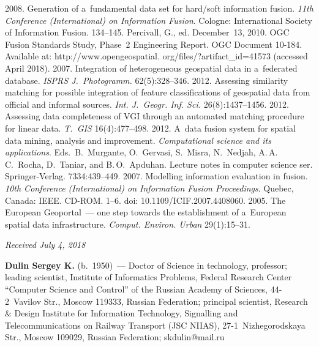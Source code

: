 \begin{multicols}{2}
{{\begin{thebibliography}{99}
 2008. Generation of a~fundamental data set for hard/soft information fusion.
\textit{11th Conference (International) on Information Fusion}. Cologne: International Society of 
Information Fusion. 134--145.
Percivall, G., ed. 
December~13, 2010. OGC Fusion Standards Study, Phase~2 Engineering Report. OGC Document  
10-184.  Available at: {\sf 
http://www.opengeospatial. org/files/?artifact\_id=41573} (accessed April 2018).
 2007. Integration of heterogeneous geospatial data in 
a~federated database. \textit{ISPRS J.~Photogramm.} 62(5):328--346. 
 2012. Assessing similarity matching for possible integration 
of feature classifications of geospatial data from official and informal sources. \textit{Int. 
J.~Geogr. Inf. Sci.} 26(8):1437--1456.
 2012. Assessing data completeness of VGI 
through an automated matching procedure for linear data. \textit{T.~GIS} 16(4):477--498.
 2012. A~data fusion system for spatial data mining, analysis 
and improvement. \textit{Computational science and its applications}. Eds.\ 
B.~Murgante, O.~Gervasi, S.~Misra, N.~Nedjah, A.\,A.\,C.~Rocha, D.~Taniar, and 
B.\,O.~Apduhan.  Lecture notes in computer science ser. Springer-Verlag. 7334:439--449. 
\bibitem{13-dul-1}
 2007. Modelling information evaluation in fusion. \textit{10th Conference 
(International) on Information Fusion Proceedings}. Quebec, Canada: IEEE. CD-ROM.  1--6.
doi: 
10.1109/ICIF.2007.4408060.
 2005. The European  
Geoportal~--- one step towards the establishment of a~European spatial data infrastructure. 
\textit{Comput. Environ. Urban} 29(1):15--31.
\end{thebibliography}

 }
 }

\end{multicols}

\vspace*{-6pt}

\hfill{\small\textit{Received July 4, 2018}}



\Contr

\noindent
\textbf{Dulin Sergey K.} (b.\ 1950)~---
Doctor of Science in technology, professor; leading scientist, Institute of 
Informatics Problems, Federal Research Center ``Computer Science and Control'' 
of the Russian Academy of Sciences, 44-2~Vavilov Str., Moscow 119333, Russian 
Federation; principal scientist, Research \& Design 
Institute for Information Technology, Signalling and Telecommunications on 
Railway Transport (JSC NIIAS), 27-1~Nizhegorodskaya Str., Moscow 109029, Russian 
Federation; \mbox{skdulin@mail.ru}

